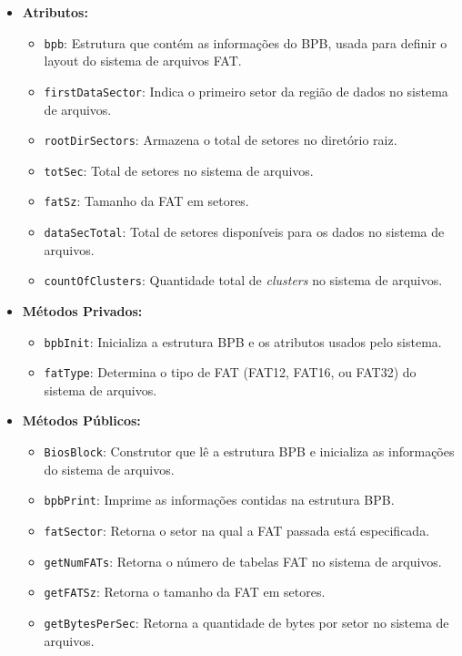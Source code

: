 \documentclass[
    12pt,				%
    oneside,   	        %
    a4paper,			%
    english,			%
    french,				%
    spanish,			%
    brazil,				%
    ]{pacotes/abntex2}
\begin{document}
\begin{itemize}
    \item \textbf{Atributos:}
        \begin{itemize}
            \item \texttt{bpb}: Estrutura que contém as informações do BPB, usada para definir o layout do sistema de arquivos FAT.
            \item \texttt{firstDataSector}: Indica o primeiro setor da região de dados no sistema de arquivos.
            \item \texttt{rootDirSectors}: Armazena o total de setores no diretório raiz.
            \item \texttt{totSec}: Total de setores no sistema de arquivos.
            \item \texttt{fatSz}: Tamanho da FAT em setores.
            \item \texttt{dataSecTotal}: Total de setores disponíveis para os dados no sistema de arquivos.
            \item \texttt{countOfClusters}: Quantidade total de \textit{clusters} no sistema de arquivos.
        \end{itemize}
    \item \textbf{Métodos Privados:}
        \begin{itemize}
            \item \texttt{bpbInit}: Inicializa a estrutura BPB e os atributos usados pelo sistema.
            \item \texttt{fatType}: Determina o tipo de FAT (FAT12, FAT16, ou FAT32) do sistema de arquivos.
        \end{itemize}
    \item \textbf{Métodos Públicos:}
        \begin{itemize}
            \item \texttt{BiosBlock}: Construtor que lê a estrutura BPB e inicializa as informações do sistema de arquivos.
            \item \texttt{bpbPrint}: Imprime as informações contidas na estrutura BPB.
            \item \texttt{fatSector}: Retorna o setor na qual a FAT passada está especificada.
            \item \texttt{getNumFATs}: Retorna o número de tabelas FAT no sistema de arquivos.
            \item \texttt{getFATSz}: Retorna o tamanho da FAT em setores.
            \item \texttt{getBytesPerSec}: Retorna a quantidade de bytes por setor no sistema de arquivos.

\end{itemize}
\end{itemize}
\end{document}
